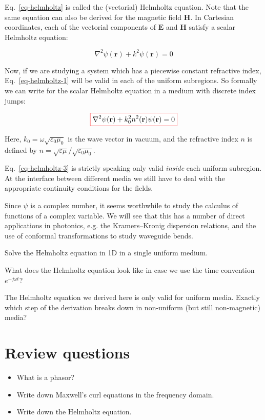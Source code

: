 Eq.~\ref{eq-helmholtz} is called the (vectorial) Helmholtz equation. Note that the same equation can also be derived for the magnetic field ${\mathbf H}$. In Cartesian coordinates, each of the vectorial components of ${\mathbf E}$ and ${\mathbf H}$ satisfy a scalar Helmholtz equation:

\begin{equation}
\nabla^2 \psi({\mathbf r}) + k^2 \psi({\mathbf r}) = 0 \label{eq-helmholtz-1}
\end{equation}

Now, if we are studying a system which has a piecewise constant refractive index, Eq.~\ref{eq-helmholtz-1} will be valid in each of the uniform subregions. So formally we can write for the scalar Helmholtz equation in a medium with discrete index jumps:

\begin{equation}
\fbox{$\displaystyle \nabla^2 \psi({\mathbf r}) + k_0^2 n^2({\mathbf r}) \psi({\mathbf r}) = 0
\label{eq-helmholtz-3}$}
\end{equation}

Here, $k_0=\omega \sqrt{\varepsilon_0 \mu_0}$ is the wave vector in vacuum, and the refractive index $n$ is defined by $n=\sqrt{\varepsilon \mu} / \sqrt{\varepsilon_0 \mu_0}$.

Eq.~\ref{eq-helmholtz-3} is strictly speaking only valid \emph{inside} each uniform subregion. At the interface between different media we still have to deal with the appropriate continuity conditions for the fields.

Since $\psi$ is a complex number, it seems worthwhile to study the calculus of functions of a complex variable. We will see that this has a number of direct applications in photonics, e.g. the Kramers--Kronig dispersion relations, and the use of conformal transformations to study waveguide bends.

\begin{exer}
Solve the Helmholtz equation in 1D in a single uniform medium.
\end{exer}

\begin{exer}
What does the Helmholtz equation look like in case we use the time convention  $e^{-j \omega t}$? 
\end{exer}

\begin{exer}
The Helmholtz equation we derived here is only valid for uniform media. Exactly which step of the derivation breaks down in non-uniform (but still non-magnetic) media?
\end{exer}

\section*{Review questions}

\begin{itemize}
\item What is a phasor?
\item Write down Maxwell's curl equations in the frequency domain.
\item Write down the Helmholtz equation.
\end{itemize}



